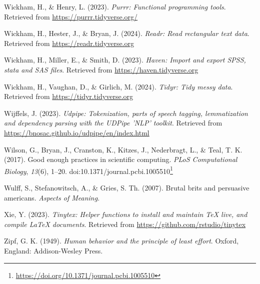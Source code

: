 \documentclass[
  letterpaper,
]{book}
\newlength{\cslhangindent}
\newenvironment{CSLReferences}[2] %
 {\begin{list}{}{%
  \setlength{\itemindent}{0pt}
  \setlength{\leftmargin}{0pt}
  \setlength{\parsep}{0pt}
  \ifodd #1
   \setlength{\leftmargin}{\cslhangindent}
   \setlength{\itemindent}{-1\cslhangindent}
  \fi
  \setlength{\itemsep}{#2\baselineskip}}}
 {\end{list}}
\theoremstyle{definition}
\theoremstyle{remark}
\DeclareRobustCommand{\href}[2]{#2\footnote{\url{#1}}}
\begin{document}
\begin{CSLReferences}{1}{0}
Wickham, H., \& Henry, L. (2023). \emph{Purrr: Functional programming
tools}. Retrieved from \url{https://purrr.tidyverse.org/}

Wickham, H., Hester, J., \& Bryan, J. (2024). \emph{Readr: Read
rectangular text data}. Retrieved from \url{https://readr.tidyverse.org}

Wickham, H., Miller, E., \& Smith, D. (2023). \emph{Haven: Import and
export SPSS, stata and SAS files}. Retrieved from
\url{https://haven.tidyverse.org}

Wickham, H., Vaughan, D., \& Girlich, M. (2024). \emph{Tidyr: Tidy messy
data}. Retrieved from \url{https://tidyr.tidyverse.org}

Wijffels, J. (2023). \emph{Udpipe: Tokenization, parts of speech
tagging, lemmatization and dependency parsing with the UDPipe 'NLP'
toolkit}. Retrieved from
\url{https://bnosac.github.io/udpipe/en/index.html}

Wilson, G., Bryan, J., Cranston, K., Kitzes, J., Nederbragt, L., \&
Teal, T. K. (2017). Good enough practices in scientific computing.
\emph{PLoS Computational Biology}, \emph{13}(6), 1--20.
doi:\href{https://doi.org/10.1371/journal.pcbi.1005510}{10.1371/journal.pcbi.1005510}

Wulff, S., Stefanowitsch, A., \& Gries, S. Th. (2007). Brutal brits and
persuasive americans. \emph{Aspects of Meaning}.

Xie, Y. (2023). \emph{Tinytex: Helper functions to install and maintain
TeX live, and compile LaTeX documents}. Retrieved from
\url{https://github.com/rstudio/tinytex}

Zipf, G. K. (1949). \emph{Human behavior and the principle of least
effort}. Oxford, England: Addison-Wesley Press.

\end{CSLReferences}


\backmatter

\printindex
\end{document}
